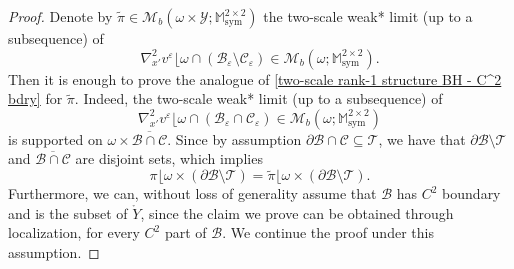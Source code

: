 \documentclass[reqno,10pt]{amsart}
\numberwithin{equation}{section}
\theoremstyle{remark}
\newcommand{\calB}{\mathcal{B}}
\newcommand{\calC}{\mathcal{C}}
\newcommand{\M}{\mathbb{M}}
\newcommand{\calT}{\mathcal{T}}
\newcommand{\calY}{\mathcal{Y}}
\DeclareMathOperator{\sym}{sym}
\newcommand{\closure}[1]{\overline{#1}}
\newcommand{\weakstar}{\xrightharpoonup{*}}
\newcommand{\weakstartwoscale}{\xrightharpoonup{2-*}}
\newcommand{\eps}{\varepsilon}
\newcommand{\Mb}{\mathcal{M}_b}
\newcommand{\mres}[1]{\lfloor{#1}}
\newcommand{\E}{{\bf E}}
\newcommand{\D}{\nabla}
\begin{document}
\begin{proof}

Denote by $\tilde{\pi} \in \Mb(\omega \times \calY;\M^{2 \times 2}_{\sym})$ the two-scale weak* limit (up to a subsequence) of
\begin{equation*}
	{\D}^2_{x'}v^\eps\mres{\omega \cap (\calB_\eps \setminus \calC_\eps)} \in \Mb(\omega;\M^{2 \times 2}_{\sym}).
\end{equation*}
Then it is enough to prove the analogue of \eqref{two-scale rank-1 structure BH - C^2 bdry} for $\tilde{\pi}$. 
Indeed, the two-scale weak* limit (up to a subsequence) of
\begin{equation*}
	{\D}^2_{x'}v^\eps\mres{\omega \cap (\calB_\eps \cap \calC_\eps)} \in \Mb(\omega;\M^{2 \times 2}_{\sym})
\end{equation*}
is supported on $\omega \times \closure{\calB \cap \calC}$. 
Since by assumption $\partial\calB \cap \calC \subseteq \calT$, we have that $\partial\calB \setminus \calT$ and $\closure{\calB \cap \calC}$ are disjoint sets, which implies
\begin{equation*}
	\pi\mres{\omega \times (\partial\calB \setminus \calT)} = \tilde{\pi}\mres{\omega \times (\partial\calB \setminus \calT)}.
\end{equation*}
Furthermore, we can, without loss of generality assume that $\calB$ has $C^2$ boundary and is the subset of $\mathring{Y}$, since the claim we prove can be obtained through localization, for every $C^2$ part of $\calB$. We continue the proof under this assumption. 


\end{proof}
\end{document}
